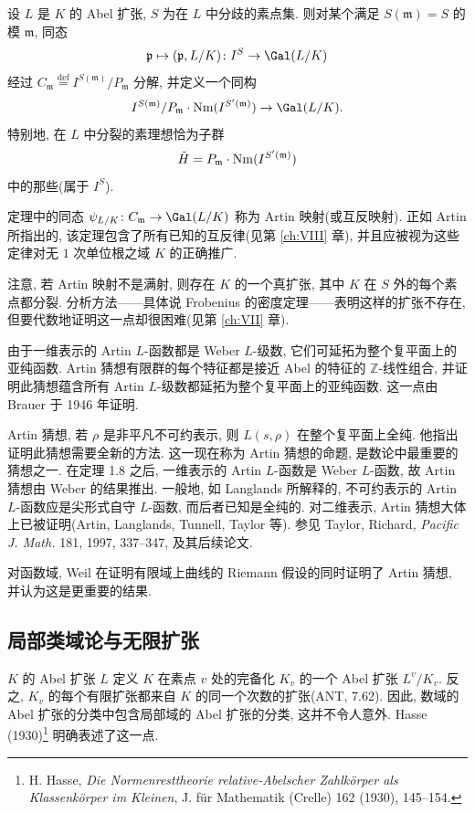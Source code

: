 \begin{theorem}[ARTIN 1927]\label{thm:0.8}
设 $L$ 是 $K$ 的 Abel 扩张, $S$ 为在 $L$ 中分歧的素点集. 则对某个满足 $S(\mathfrak{m}) = S$ 的模 $\mathfrak{m}$, 同态
\[
\mathfrak{p} \mapsto (\mathfrak{p}, L/K) \colon I^{S} \to \Gal(L/K)
\]
经过 $C_{\mathfrak{m}} \overset{\mathrm{def}}{=} I^{S(\mathfrak{m})}/P_{\mathfrak{m}}$ 分解, 并定义一个同构
\[
I^{S(\mathfrak{m})}/P_{\mathfrak{m}} \cdot \Nm(I^{S'(\mathfrak{m})}) \to \Gal(L/K).
\]
特别地, 在 $L$ 中分裂的素理想恰为子群
\[
\tilde{H} = P_{\mathfrak{m}} \cdot \operatorname{Nm}(I^{S'(\mathfrak{m})})
\]
中的那些(属于 $I^{S}$).
\end{theorem}

定理中的同态 $\psi_{L/K} \colon C_{\mathfrak{m}} \to \Gal(L/K)$ 称为 Artin 映射(或互反映射). 正如 Artin 所指出的, 该定理包含了所有已知的互反律(见第 \ref{ch:VIII} 章), 并且应被视为这些定律对无 $1$ 次单位根之域 $K$ 的正确推广.

注意, 若 Artin 映射不是满射, 则存在 $K$ 的一个真扩张, 其中 $K$ 在 $S$ 外的每个素点都分裂. 分析方法——具体说 Frobenius 的密度定理——表明这样的扩张不存在, 但要代数地证明这一点却很困难(见第 \ref{ch:VII} 章).

由于一维表示的 Artin $L$-函数都是 Weber $L$-级数, 它们可延拓为整个复平面上的亚纯函数. Artin 猜想有限群的每个特征都是接近 Abel 的特征的 $\mathbb{Z}$-线性组合, 并证明此猜想蕴含所有 Artin $L$-级数都延拓为整个复平面上的亚纯函数. 这一点由 Brauer 于 1946 年证明.

Artin 猜想, 若 $\rho$ 是非平凡不可约表示, 则 $L(s, \rho)$ 在整个复平面上全纯. 他指出证明此猜想需要全新的方法. 这一现在称为 Artin 猜想的命题, 是数论中最重要的猜想之一. 在定理 1.8 之后, 一维表示的 Artin $L$-函数是 Weber $L$-函数, 故 Artin 猜想由 Weber 的结果推出. 一般地, 如 Langlands 所解释的, 不可约表示的 Artin $L$-函数应是尖形式自守 $L$-函数, 而后者已知是全纯的. 对二维表示, Artin 猜想大体上已被证明(Artin, Langlands, Tunnell, Taylor 等). 参见 Taylor, Richard, \emph{Pacific J. Math.} 181, 1997, 337–347, 及其后续论文.

对函数域, Weil 在证明有限域上曲线的 Riemann 假设的同时证明了 Artin 猜想, 并认为这是更重要的结果.

\subsection*{局部类域论与无限扩张}

$K$ 的 Abel 扩张 $L$ 定义 $K$ 在素点 $v$ 处的完备化 $K_{v}$ 的一个 Abel 扩张 $L^{v}/K_{v}$. 反之, $K_{v}$ 的每个有限扩张都来自 $K$ 的同一个次数的扩张(ANT, 7.62). 因此, 数域的 Abel 扩张的分类中包含局部域的 Abel 扩张的分类, 这并不令人意外. Hasse (1930)\footnote{H. Hasse, \emph{Die Normenresttheorie relative-Abelscher Zahlkörper als Klassenkörper im Kleinen}, J. für Mathematik (Crelle) 162 (1930), 145–154.} 明确表述了这一点.


